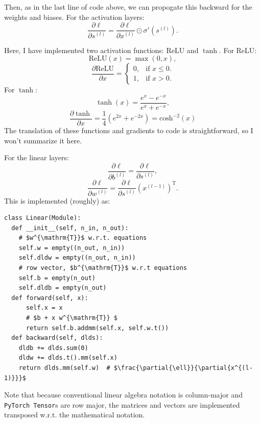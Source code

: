 \documentclass[prl, article, twocolumn]{revtex4-1}
\begin{document}
Then, as in the last line of code above, we can propogate this backward for the weights and biases. For the activation layers:
\begin{equation}
    \frac{\partial{\ell}}{\partial{s^{(l)}}} =
    \frac{\partial{\ell}}{\partial{x^{(l)}}} \odot \sigma' \left( s^{(l)} \right).
\end{equation}

Here, I have implemented two activation functions: ReLU and $\tanh$.
For ReLU:
\begin{equation}
    \mathrm{ReLU}(x) = \max(0, x),
\end{equation}
\begin{equation}
    \frac{\partial{\mathrm{ReLU}}}{\partial{x}} = 
    \begin{cases}
        0, & \text{if } x \leq 0. \\
        1, & \text{if } x > 0.
    \end{cases}
\end{equation}
For $\tanh$:
\begin{equation}
    \tanh(x) = \frac{e^x-e^{-x}}{e^{x}+e^{-x}},
\end{equation}
\begin{equation}
    \frac{\partial{\tanh}}{\partial{x}} =
    \frac{1}{4} \left( e^{2x} + e^{-2x} \right) =
    \mathrm{cosh}^{-2}(x)
\end{equation}
The translation of these functions and gradients to code is straightforward, so I won't summarize it here.

For the linear layers:
\begin{equation}
    \frac{\partial{\ell}}{\partial{b^{(l)}}} = \frac{\partial{\ell}}{\partial{s^{(l)}}},
\end{equation}
\begin{equation}
    \frac{\partial{\ell}}{\partial{w^{(l)}}} =
    \frac{\partial{\ell}}{\partial{s^{(l)}}} \left( x^{(l-1)} \right) ^{\mathrm{T}}.
\end{equation}
This is implemented (roughly) as:
\begin{verbatim}
class Linear(Module):
  def __init__(self, n_in, n_out):
    # $w^{\mathrm{T}}$ w.r.t. equations
    self.w = empty((n_out, n_in))
    self.dldw = empty((n_out, n_in))
    # row vector, $b^{\mathrm{T}}$ w.r.t equations
    self.b = empty(n_out)
    self.dldb = empty(n_out)
  def forward(self, x):
      self.x = x
      # $b + x w^{\mathrm{T}} $
      return self.b.addmm(self.x, self.w.t())
  def backward(self, dlds):
    dldb += dlds.sum(0)
    dldw += dlds.t().mm(self.x)
    return dlds.mm(self.w)  # $\frac{\partial{\ell}}{\partial{x^{(l-1)}}}$
\end{verbatim}
Note that because conventional linear algebra notation is column-major and \texttt{PyTorch Tensor}s are row major, the matrices and vectors are implemented transposed w.r.t. the mathematical notation.
\end{document}
